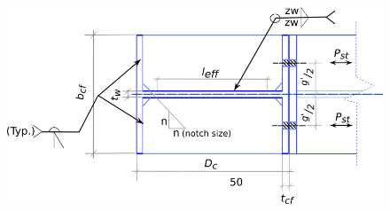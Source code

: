 \documentclass[11.5pt,a4paper,oneside]{report}
\begin{document}
\begin{Form}
\begin{figure}[ht]
	\centering
	\includegraphics[scale=0.5]{COLCP.png}
\end{figure}


\end{Form}
\end{document}
